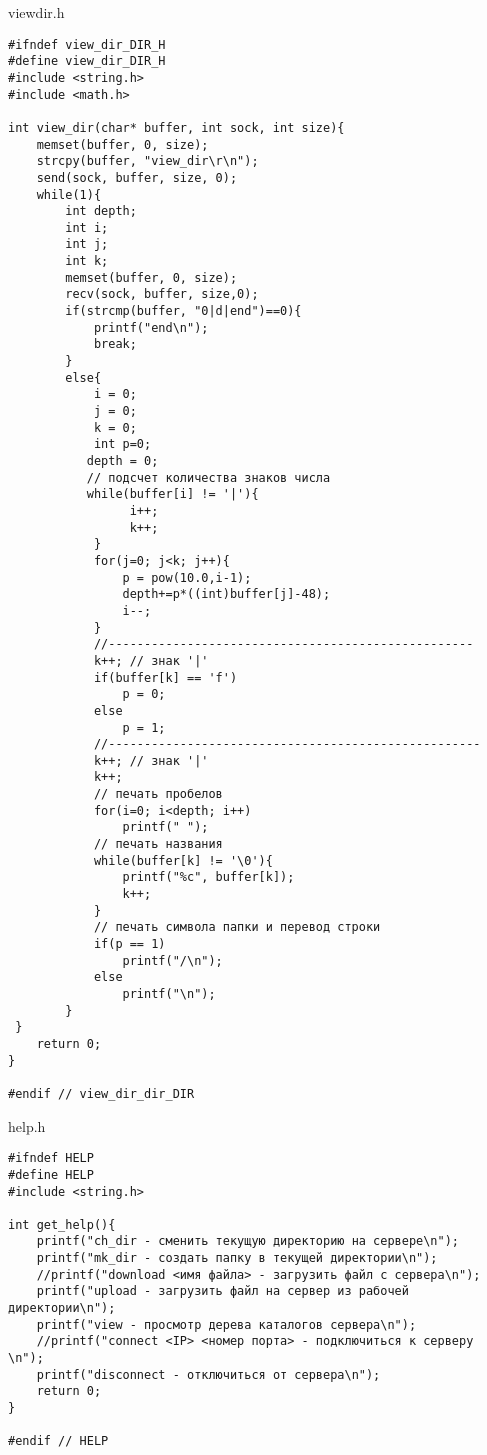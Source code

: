 \documentclass[12pt,a4paper]{report}
\begin{document}
viewdir.h
\begin{lstlisting}
#ifndef view_dir_DIR_H
#define view_dir_DIR_H
#include <string.h>
#include <math.h>

int view_dir(char* buffer, int sock, int size){
    memset(buffer, 0, size);
    strcpy(buffer, "view_dir\r\n");
    send(sock, buffer, size, 0);
    while(1){
        int depth;
        int i;
        int j;
        int k;
        memset(buffer, 0, size);
        recv(sock, buffer, size,0);
        if(strcmp(buffer, "0|d|end")==0){
            printf("end\n");
            break;
        }
        else{
            i = 0;
            j = 0;
            k = 0;
            int p=0;
           depth = 0;
           // подсчет количества знаков числа
           while(buffer[i] != '|'){
                 i++;
                 k++;
            }
            for(j=0; j<k; j++){
                p = pow(10.0,i-1);
                depth+=p*((int)buffer[j]-48);
                i--;
            }
            //---------------------------------------------------
            k++; // знак '|'
            if(buffer[k] == 'f')
                p = 0;
            else
                p = 1;
            //----------------------------------------------------
            k++; // знак '|'
            k++;
            // печать пробелов
            for(i=0; i<depth; i++)
                printf(" ");
            // печать названия
            while(buffer[k] != '\0'){
                printf("%c", buffer[k]);
                k++;
            }
            // печать символа папки и перевод строки
            if(p == 1)
                printf("/\n");
            else
                printf("\n");
        }
 }
    return 0;
}

#endif // view_dir_dir_DIR
\end{lstlisting}
help.h
\begin{lstlisting}
#ifndef HELP
#define HELP
#include <string.h>

int get_help(){
    printf("ch_dir - сменить текущую директорию на сервере\n");
    printf("mk_dir - создать папку в текущей директории\n");
    //printf("download <имя файла> - загрузить файл с сервера\n");
    printf("upload - загрузить файл на сервер из рабочей директории\n");
    printf("view - просмотр дерева каталогов сервера\n");
    //printf("connect <IP> <номер порта> - подключиться к серверу \n");
    printf("disconnect - отключиться от сервера\n");
    return 0;
}

#endif // HELP
\end{lstlisting}
\end{document}
